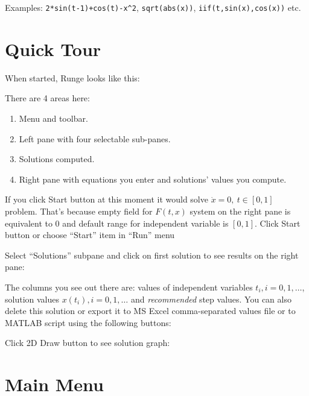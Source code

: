 \documentclass[12pt]{article}
\begin{document}
Examples: \texttt{2*sin(t-1)+cos(t)-x^2}, \texttt{sqrt(abs(x))}, \texttt{iif(t,sin(x),cos(x))} etc.



\section{Quick Tour}

When started, Runge looks like this:


There are 4 areas here:
\begin{enumerate}
\item Menu and toolbar.
\item Left pane with four selectable sub-panes.
\item Solutions computed.
\item Right pane with equations you enter and solutions' values you compute.
\end{enumerate}

If you click Start button 
at this moment it would solve \(\dot x=0,\ t\in[0,1]\) problem.
That's because empty field for \(F(t,x)\) system on the right pane is equivalent to \(0\)
and default range for independent variable is \([0,1]\). Click Start button 
or choose ``Start'' item in ``Run'' menu


Select ``Solutions'' subpane and click on first solution to see results on the right pane:


The columns you see out there are: values of independent variables \(t_i, i=0,1,\dots\), 
solution values \(x(t_i), i=0,1,\dots\) and \textit{recommended} step values.
You can also delete this solution or export it to MS Excel comma-separated values file or to MATLAB script
using the following buttons:


Click 2D Draw button  to see solution graph:






\section{Main Menu}
\end{document}
